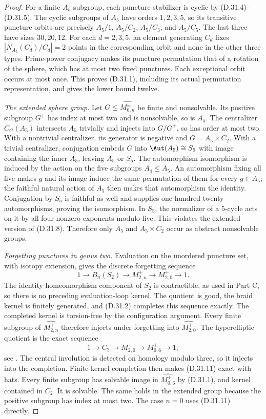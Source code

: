 \begin{proof}
For a finite $A_5$ subgroup, each puncture stabilizer is cyclic by
(D.31.4)--(D.31.5). The cyclic subgroups of $A_5$ have orders
$1,2,3,5$, so its transitive puncture orbits are precisely
$A_5/1$, $A_5/C_2$, $A_5/C_3$, and $A_5/C_5$.
The last three have sizes $30,20,12$. For each $d=2,3,5$,
an element generating $C_d$ fixes
$|N_{A_5}(C_d)/C_d|=2$ points in the corresponding orbit and
none in the other three types. Prime-power conjugacy makes its
puncture permutation that of a rotation of the sphere, which
has at most two fixed punctures. Each exceptional orbit occurs
at most once. This proves (D.31.1), including its actual
permutation representation, and gives the lower bound twelve.

\emph{The extended sphere group.}
Let $G\leq\widehat{M_{0,n}^{\pm}}$ be finite and nonsolvable.
Its positive subgroup $G^+$ has index at most two and is
nonsolvable, so is $A_5$. The centralizer $C_G(A_5)$ intersects
$A_5$ trivially and injects into $G/G^+$, so has order at most
two. With a nontrivial centralizer, its generator is negative
and $G=A_5\times C_2$. With a trivial centralizer, conjugation
embeds $G$ into $\Aut(A_5)\cong S_5$ with image containing the
inner $A_5$, leaving $A_5$ or $S_5$. The automorphism isomorphism
is induced by the action on the five subgroups $A_4\leq A_5$.
An automorphism fixing all five makes $g$ and its image induce
the same permutation of them for every $g\in A_5$; the faithful
natural action of $A_5$ then makes that automorphism the identity.
Conjugation by $S_5$ is faithful as well and supplies one hundred
twenty automorphisms, proving the isomorphism. In $S_5$, the normalizer of
a $5$-cycle acts on it by all four nonzero exponents modulo five.
This violates the extended version of (D.31.8). Therefore only
$A_5$ and $A_5\times C_2$ occur as abstract nonsolvable groups.

\emph{Forgetting punctures in genus two.}
Evaluation on the unordered puncture set, with isotopy extension,
gives the discrete forgetting sequence
\[
 1\longrightarrow B_n(S_2)\longrightarrow M_{2,n}^+
        \longrightarrow M_{2,0}^+\longrightarrow1.      \tag{D.31.10}
\]
The identity homeomorphism component of $S_2$ is contractible,
as used in Part C, so there is no preceding evaluation-loop
kernel. The quotient is good, the braid kernel is finitely
generated, and (D.31.2) completes this sequence exactly.
The completed kernel is torsion-free by the configuration
argument. Every finite subgroup of $\widehat{M_{2,n}^+}$
therefore injects under forgetting into $\widehat{M_{2,0}^+}$.
The hyperelliptic quotient is the exact sequence
\[
 1\longrightarrow C_2\longrightarrow M_{2,0}^+
        \longrightarrow M_{0,6}^+\longrightarrow1;
                                                               \tag{D.31.11}
\]
see \cite[Propositions~3.2--3.3]{A-BigelowBudney2001}.
The central involution is detected on homology modulo three,
so it injects into the completion. Finite-kernel completion
then makes (D.31.11) exact with hats. Every finite subgroup
has solvable image in $\widehat{M_{0,6}^+}$ by (D.31.1),
and kernel contained in $C_2$. It is solvable. The same holds
in the extended group because the positive subgroup has
index at most two. The case $n=0$ uses (D.31.11) directly.


\end{proof}
